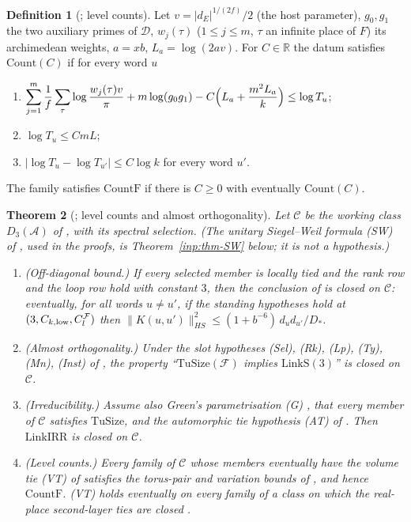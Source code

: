 \documentclass[10pt]{amsart}
\newtheorem{theorem}{Theorem}[section]
\theoremstyle{definition}
\newtheorem{definition}[theorem]{Definition}
\theoremstyle{remark}
\newcommand{\R}{\mathbb R}
\begin{document}
\begin{definition}[{\cite[Definition~\ref{A-i3:def-count}]{Annex}}; level counts]\label{inp:def-count}
Let $v=|d_E|^{1/(2f)}/2$ (the host parameter), $g_0,g_1$ the two auxiliary
primes of $\mathcal D$, $w_j(\tau)$ ($1\le j\le m$, $\tau$ an infinite place
of $F$) its archimedean weights, $a=xb$, $L_a=\log(2av)$.  For $C\in\R$ the
datum satisfies $\mathrm{Count}(C)$ if for every word $u$
\begin{enumerate}
\item $\displaystyle\sum_{j=1}^m\frac1f\sum_\tau\log\frac{w_j(\tau)v}{\pi}
 +m\log(g_0g_1)-C\Bigl(L_a+\frac{m^2L_a}{k}\Bigr)\le\log T_u$;
\item $\log T_u\le CmL$;
\item $|\log T_u-\log T_{u'}|\le C\log k$ for every word $u'$.
\end{enumerate}
The family satisfies $\mathrm{CountF}$ if there is $C\ge0$ with eventually
$\mathrm{Count}(C)$.
\end{definition}

\begin{theorem}[{\cite[Theorem~\ref{A-i3:thm-main}]{Annex}}; level counts and almost orthogonality]\label{inp:thm-counts}
Let $\mathcal C$ be the working class $D_3(\mathcal A)$ of
\cite[\S\ref{A-i4:ssec-links}]{Annex}, with its spectral selection.  (The
unitary Siegel--Weil formula (SW) of
\cite[Definition~\ref{A-i3:S-def-SW}]{Annex}, used in the proofs, is
Theorem~\ref{inp:thm-SW} below; it is not a hypothesis.)
\begin{enumerate}
\item[(a)] (Off-diagonal bound.)  If every selected member is locally tied and
the rank row and the loop row hold with constant $3$, then the conclusion of
\cite[Proposition~\ref{A-i3:prop-S-closed}]{Annex} is closed on $\mathcal C$: eventually, for
all words $u\ne u'$, if the standing hypotheses hold at
$(3,C_{k,\rm low},C_l^{\mathcal F})$ then
$\|K(u,u')\|_{HS}^2\le(1+b^{-6})\,d_ud_{u'}/D_*$.
\item[(b)] (Almost orthogonality.)  Under the slot hypotheses
(Sel), (Rk), (Lp), (Ty), (Mn), (Inst) of
\cite[Theorem~\ref{A-i3:thm-linkS-slots}]{Annex},
the property ``$\mathrm{TuSize}(\mathcal F)$ implies $\mathrm{LinkS}(3)$'' is
closed on $\mathcal C$.
\item[(c)] (Irreducibility.)  Assume also Green's parametrisation (G)
\cite[Definition~\ref{A-i3:def-green}]{Annex}, that every member of $\mathcal C$ satisfies
$\mathrm{TuSize}$, and the automorphic tie hypothesis (AT) of
\cite[Proposition~\ref{A-i3:prop-irr-row}]{Annex}.  Then $\mathrm{LinkIRR}$ is closed on
$\mathcal C$.
\item[(d)] (Level counts.)  Every family of $\mathcal C$ whose members
eventually have the volume tie (VT) of
\cite[Proposition~\ref{A-i3:prop-massratio}]{Annex}
satisfies the torus-pair and variation bounds of
\cite[Proposition~\ref{A-i3:prop-part5}]{Annex}, and hence $\mathrm{CountF}$.  (VT) holds
eventually on every family of a class on which the real-place second-layer
ties are closed \cite[Definition~\ref{A-i4:def-hyps}(vii)]{Annex}.
\end{enumerate}
\end{theorem}
\end{document}
